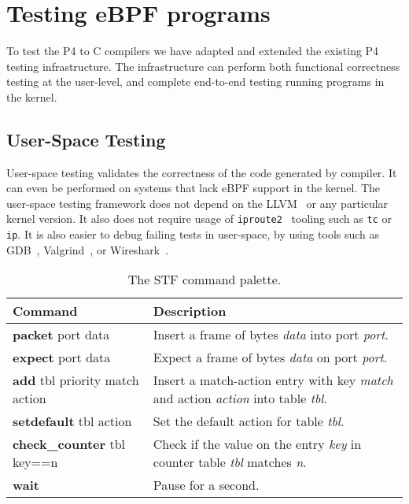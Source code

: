 \section{Testing eBPF programs}\label{sec:testing}

To test the P4 to C compilers we have adapted and extended the
existing P4 testing infrastructure. The infrastructure can perform
both functional correctness testing at the user-level, and complete
end-to-end testing running programs in the kernel.

\subsection{User-Space Testing}

User-space testing validates the correctness of the code generated by
compiler. It can even be performed on systems that lack eBPF support
in the kernel. The user-space testing framework does not depend on
the LLVM~\cite{llvm} or any particular kernel version.  It also does
not require usage of \texttt{iproute2}~\cite{iproute} tooling such as
\texttt{tc} or \texttt{ip}.  It is also easier to debug failing tests
in user-space, by using tools such as GDB~\cite{gdb},
Valgrind~\cite{valgrind}, or Wireshark~\cite{wireshark}.

\begin{table*}[h]
	\footnotesize
	\begin{center}
		\begin{tabular}{|p{5.8cm}|p{10.3cm}|} \hline
			\textbf{Command} & \textbf{Description} \\ \hline \hline
			\textbf{packet} port data & Insert a frame of bytes
			\textit{data} into port \textit{port}.    \\ \hline
			\textbf{expect} port data & Expect a frame of bytes
			\textit{data} on port \textit{port}.  \\ \hline
			\textbf{add} tbl priority match action & Insert a
			match-action entry with key \textit{match} and action
			\textit{action} into table \textit{tbl}. \\ \hline
			\textbf{setdefault} tbl action & Set the default action for table
			\textit{tbl}. \\
			\hline
			\textbf{check\_counter} tbl key==n & Check if the value on
			the entry \textit{key} in counter table \textit{tbl} matches
			\textit{n}.  \\
			\hline
			\textbf{wait} & Pause for a second. \\ \hline
		\end{tabular}
		\caption{The STF command palette.}\label{table:stf}
	\end{center}
\end{table*}

